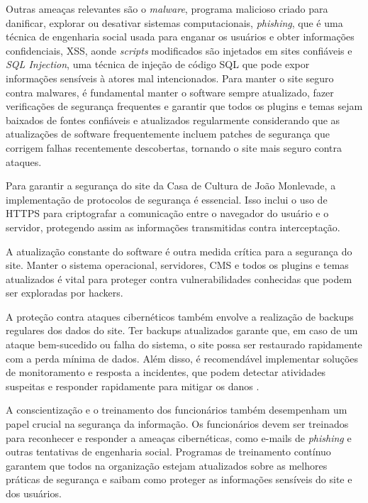 Outras ameaças relevantes são o \textit{malware}, programa malicioso criado para danificar, explorar ou desativar sistemas computacionais, \textit{phishing}, que é uma técnica de engenharia social usada para enganar os usuários e obter informações confidenciais, \ac{XSS}, aonde \textit{scripts} modificados são injetados em sites confiáveis e \textit{SQL Injection}, uma técnica de injeção de código \ac{SQL} que pode expor informações sensíveis à atores mal intencionados. Para manter o site seguro contra malwares, é fundamental manter o software sempre atualizado, fazer verificações de segurança frequentes e garantir que todos os plugins e temas sejam baixados de fontes confiáveis e atualizados regularmente considerando que as atualizações de software frequentemente incluem patches de segurança que corrigem falhas recentemente descobertas, tornando o site mais seguro contra ataques.

Para garantir a segurança do site da Casa de Cultura de João Monlevade, a implementação de protocolos de segurança é essencial. Isso inclui o uso de \ac{HTTPS} para criptografar a comunicação entre o navegador do usuário e o servidor, protegendo assim as informações transmitidas contra interceptação. 

A atualização constante do software é outra medida crítica para a segurança do site. Manter o sistema operacional, servidores, \ac{CMS} e todos os plugins e temas atualizados é vital para proteger contra vulnerabilidades conhecidas que podem ser exploradas por hackers. 

A proteção contra ataques cibernéticos também envolve a realização de backups regulares dos dados do site. Ter backups atualizados garante que, em caso de um ataque bem-sucedido ou falha do sistema, o site possa ser restaurado rapidamente com a perda mínima de dados. Além disso, é recomendável implementar soluções de monitoramento e resposta a incidentes, que podem detectar atividades suspeitas e responder rapidamente para mitigar os danos \cite{baykara2018overview}.

A conscientização e o treinamento dos funcionários também desempenham um papel crucial na segurança da informação. Os funcionários devem ser treinados para reconhecer e responder a ameaças cibernéticas, como e-mails de \textit{phishing} e outras tentativas de engenharia social. Programas de treinamento contínuo garantem que todos na organização estejam atualizados sobre as melhores práticas de segurança e saibam como proteger as informações sensíveis do site e dos usuários.

